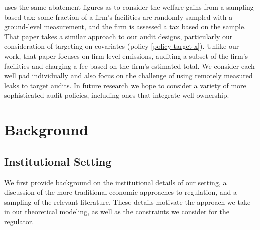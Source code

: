 \textcite{Marks:2019} uses the same abatement figures as \textcite{Marks:2021} to consider the welfare gains from a sampling-based tax: some fraction of a firm's facilities are randomly sampled with a ground-level measurement, and the firm is assessed a tax based on the sample.
That paper takes a similar approach to our audit designs, particularly our consideration of targeting on covariates (policy \ref{policy-target-x}).
Unlike our work, that paper focuses on firm-level emissions, auditing a subset of the firm's facilities and charging a fee based on the firm's estimated total.
We consider each well pad individually and also focus on the challenge of using remotely measured leaks to target audits.
In future research we hope to consider a variety of more sophisticated audit policies, including ones that integrate well ownership.


\section{Background}
\label{sec:background}

\subsection{Institutional Setting}
\label{sec:institutional-setting}

We first provide background on the institutional details of our setting, a discussion of the more traditional economic approaches to regulation, and a sampling of the relevant literature.
These details motivate the approach we take in our theoretical modeling, as well as the constraints we consider for the regulator.

